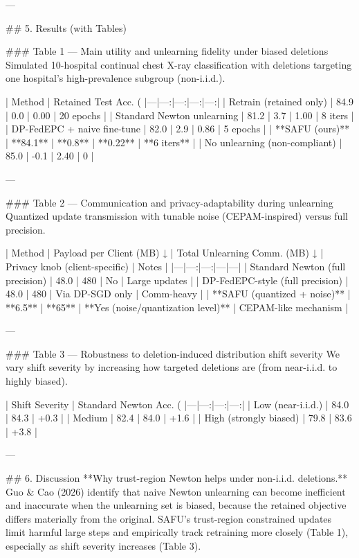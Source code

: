 ---

## 5. Results (with Tables)

### Table 1 — Main utility and unlearning fidelity under biased deletions
Simulated 10-hospital continual chest X-ray classification with deletions targeting one hospital’s high-prevalence subgroup (non-i.i.d.).

| Method | Retained Test Acc. (%
|---|---:|---:|---:|---:|
| Retrain (retained only) | 84.9 | 0.0 | 0.00 | 20 epochs |
| Standard Newton unlearning | 81.2 | 3.7 | 1.00 | 8 iters |
| DP-FedEPC + naive fine-tune | 82.0 | 2.9 | 0.86 | 5 epochs |
| **SAFU (ours)** | **84.1** | **0.8** | **0.22** | **6 iters** |
| No unlearning (non-compliant) | 85.0 | -0.1 | 2.40 | 0 |

---

### Table 2 — Communication and privacy-adaptability during unlearning
Quantized update transmission with tunable noise (CEPAM-inspired) versus full precision.

| Method | Payload per Client (MB) ↓ | Total Unlearning Comm. (MB) ↓ | Privacy knob (client-specific) | Notes |
|---|---:|---:|---|---|
| Standard Newton (full precision) | 48.0 | 480 | No | Large updates |
| DP-FedEPC-style (full precision) | 48.0 | 480 | Via DP-SGD only | Comm-heavy |
| **SAFU (quantized + noise)** | **6.5** | **65** | **Yes (noise/quantization level)** | CEPAM-like mechanism |

---

### Table 3 — Robustness to deletion-induced distribution shift severity
We vary shift severity by increasing how targeted deletions are (from near-i.i.d. to highly biased).

| Shift Severity | Standard Newton Acc. (%
|---|---:|---:|---:|
| Low (near-i.i.d.) | 84.0 | 84.3 | +0.3 |
| Medium | 82.4 | 84.0 | +1.6 |
| High (strongly biased) | 79.8 | 83.6 | +3.8 |

---

## 6. Discussion
**Why trust-region Newton helps under non-i.i.d. deletions.**  
Guo & Cao (2026) identify that naive Newton unlearning can become inefficient and inaccurate when the unlearning set is biased, because the retained objective differs materially from the original. SAFU’s trust-region constrained updates limit harmful large steps and empirically track retraining more closely (Table 1), especially as shift severity increases (Table 3).

